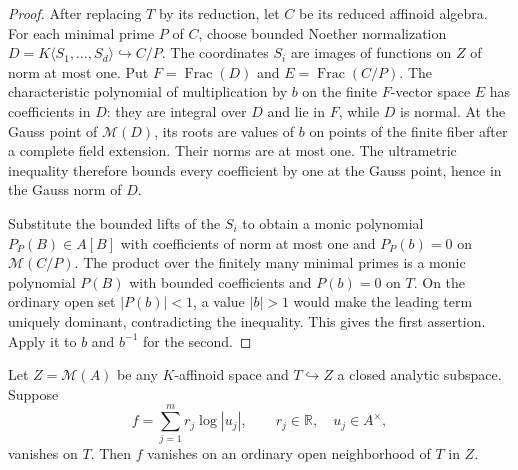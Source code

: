 \documentclass[11pt,a4paper]{amsart}
\begin{document}
\begin{proof}
After replacing $T$ by its reduction, let $C$ be its reduced affinoid algebra. For each minimal prime $P$ of $C$, choose bounded Noether normalization $D=K\langle S_1,\ldots,S_d\rangle\hookrightarrow C/P$. The coordinates $S_i$ are images of functions on $Z$ of norm at most one. Put $F=\operatorname{Frac}(D)$ and $E=\operatorname{Frac}(C/P)$. The characteristic polynomial of multiplication by $b$ on the finite $F$-vector space $E$ has coefficients in $D$: they are integral over $D$ and lie in $F$, while $D$ is normal. At the Gauss point of $\mathcal M(D)$, its roots are values of $b$ on points of the finite fiber after a complete field extension. Their norms are at most one. The ultrametric inequality therefore bounds every coefficient by one at the Gauss point, hence in the Gauss norm of $D$.

Substitute the bounded lifts of the $S_i$ to obtain a monic polynomial $P_P(B)\in A[B]$ with coefficients of norm at most one and $P_P(b)=0$ on $\mathcal M(C/P)$. The product over the finitely many minimal primes is a monic polynomial $P(B)$ with bounded coefficients and $P(b)=0$ on $T$. On the ordinary open set $|P(b)|<1$, a value $|b|>1$ would make the leading term uniquely dominant, contradicting the inequality. This gives the first assertion. Apply it to $b$ and $b^{-1}$ for the second.
\end{proof}

\begin{lemma}\label{lem:real-log-tube}
Let $Z=\mathcal M(A)$ be any $K$-affinoid space and $T\hookrightarrow Z$ a closed analytic subspace. Suppose
\[
 f=\sum_{j=1}^{m}r_j\log|u_j|,\qquad r_j\in\mathbb R,\quad u_j\in A^\times,
\]
vanishes on $T$. Then $f$ vanishes on an ordinary open neighborhood of $T$ in $Z$.
\end{lemma}
\end{document}
